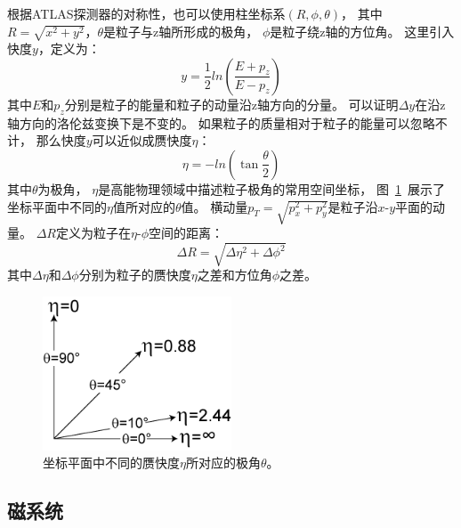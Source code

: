 根据ATLAS探测器的对称性，也可以使用柱坐标系$(R,\phi,\theta)$，
其中$R=\sqrt{x^2+y^2}$，$\theta$是粒子与z轴所形成的极角，
$\phi$是粒子绕z轴的方位角。
这里引入快度$y$，定义为：
\begin{equation} 
\label{eq:ydef}
y=\frac{1}{2}ln\left( \frac{E+p_{z}}{E-p_{z}} \right)
\end{equation}
其中$E$和$p_{z}$分别是粒子的能量和粒子的动量沿z轴方向的分量。
可以证明$\Delta y$在沿z轴方向的洛伦兹变换下是不变的。
如果粒子的质量相对于粒子的能量可以忽略不计，
那么快度$y$可以近似成赝快度$\eta$：
\begin{equation} 
\label{eq:etadef}
\eta=-ln\left(\tan\frac{\theta}{2} \right)
\end{equation}
其中$\theta$为极角，
$\eta$是高能物理领域中描述粒子极角的常用空间坐标，
图~\ref{fig:ATLAS4}~展示了坐标平面中不同的$\eta$值所对应的$\theta$值。
横动量$p_{T}=\sqrt{p_x^2+p_y^2}$是粒子沿$x$-$y$平面的动量。
$\Delta R$定义为粒子在$\eta$-$\phi$空间的距离：
\begin{equation} 
\label{eq:DRdef}
\Delta R=\sqrt{\Delta\eta^2+\Delta\phi^2}
\end{equation}
其中$\Delta\eta$和$\Delta\phi$分别为粒子的赝快度$\eta$之差和方位角$\phi$之差。

\begin{figure}
  \begin{center}
    \includegraphics[width=0.5\textwidth]{figuresEXP/ATLAS4.png}
  \end{center}
  \caption{
坐标平面中不同的赝快度$\eta$所对应的极角$\theta$。
  }
    \label{fig:ATLAS4}
\end{figure}


\subsection{磁系统}
\label{sec:ATLASMS}

